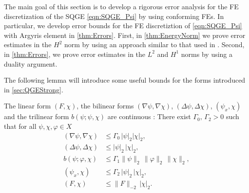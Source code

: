 The main goal of this section is to develop a rigorous error analysis for the FE
discretization of the SQGE \eqref{eqn:SQGE_Psi} by using conforming FEs. In
particular, we develop error bounds for the FE discretiztion of
\eqref{eqn:SQGE_Psi} with Argyris element in \autoref{thm:Errors}. First, in
\autoref{thm:EnergyNorm} we prove error estimates in the $H^2$ norm by using an
approach similar to that used in \cite{Cayco86}.  Second, in
\autoref{thm:Errors}, we prove error estimates in the $L^2$ and $H^1$ norms by
using a duality argument.

The following lemma will introduce some useful bounds for the forms introduced
in \autoref{sec:QGEStrong}.
\begin{lemma} \label{lma:ContinuousForms}
  The linear form $(F,\chi)$, the bilinear forms $(\nabla \psi, \nabla \chi)$,
  $(\Delta \psi, \Delta \chi)$, $(\psi_x, \chi)$ and the trilinear form $b(\psi;
  \psi, \chi)$ are continuous \cite{Cayco86}: There exist $\Gamma_0,\,
   \Gamma_2 > 0$ such that for all $\psi, \chi, \varphi\in X$
  \begin{align}
    (\nabla \psi, \nabla \chi) &\le \Gamma_0\, |\psi|_2 |\chi|_2,
      \label{eqn:a0cont} \\
    (\Delta \psi, \Delta \chi) &\le |\psi|_2\, |\chi|_2, \label{eqn:a1Cont} \\
    b(\psi;\varphi,\chi) &\le \Gamma_1 \|\psi\|_2\, \|\varphi\|_2\, \|\chi\|_2,
      \label{eqn:BH2Bounds} \\
    (\psi_x,\chi) &\le \Gamma_2 \, |\psi|_2 \, |\chi|_2, \label{eqn:a3Cont} \\
    (F,\chi) &\le \|F\|_{-2} \, |\chi|_2.
      \label{eqn:lCont}
  \end{align}
\end{lemma}
